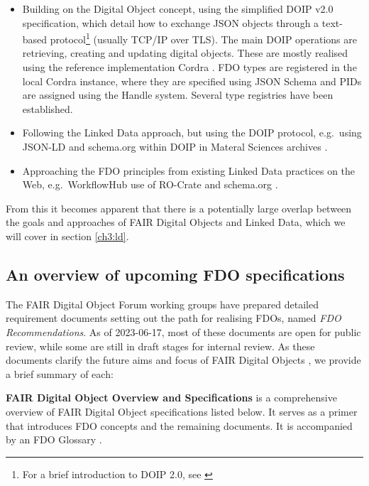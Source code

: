 \begin{itemize}
\tightlist
\item
  Building on the Digital Object concept, using the simplified DOIP v2.0 \cite{DONA 2018} specification, which detail how to exchange JSON objects through a text-based protocol\footnote{For a brief introduction to DOIP 2.0, see \cite{CNRI 2023b}} (usually TCP/IP over TLS). The main DOIP operations are retrieving, creating and updating digital objects. These are mostly realised using the reference implementation Cordra \cite{Tupelo-Scheck 2022}. FDO types are registered in the local Cordra instance, where they are specified using JSON Schema \cite{Wright 2022} and PIDs are assigned using the Handle system. Several type registries have been established.
\item
  Following the Linked Data approach, but using the DOIP protocol, e.g.~using JSON-LD and schema.org within DOIP in Materal Sciences archives \cite{Riccardi 2022}.
\item
  Approaching the FDO principles from existing Linked Data practices on the Web, e.g.~WorkflowHub use of RO-Crate and schema.org \cite{Soiland-Reyes 2022c}.
\end{itemize}

From this it becomes apparent that there is a potentially large overlap between the goals and approaches of FAIR Digital Objects and Linked Data, which we will cover in section \vref{ch3:ld}.


\subsection{An overview of upcoming FDO specifications}\label{ch3:next-step-fdo}

The FAIR Digital Object Forum \cite{FAIRDigitalObjects} working groups have prepared detailed requirement documents \cite{FDO Specs} setting out the path for realising FDOs, named \emph{FDO Recommendations}. As of 2023-06-17, most of these documents are open for public review, while some are still in draft stages for internal review. As these documents clarify the future aims and focus of FAIR Digital Objects \cite{Lannom 2022b}, we provide a brief summary of each:

\textbf{FAIR Digital Object Overview and Specifications} \cite{Ivonne 2023} is a comprehensive overview of FAIR Digital Object specifications listed below. It serves as a primer that introduces FDO concepts and the remaining documents. It is accompanied by an FDO Glossary \cite{Broeder 2022}.

